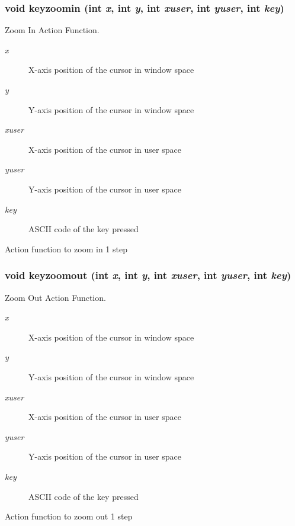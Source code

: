 \subsubsection{\setlength{\rightskip}{0pt plus 5cm}void keyzoomin (int {\em x}, int {\em y}, int {\em xuser}, int {\em yuser}, int {\em key})}\label{xtvutils_8c_a210}


Zoom In Action Function. 

\begin{Desc}
\item[Parameters:]
\begin{description}
\item[{\em x}]X-axis position of the cursor in window space \item[{\em y}]Y-axis position of the cursor in window space \item[{\em xuser}]X-axis position of the cursor in user space \item[{\em yuser}]Y-axis position of the cursor in user space \item[{\em key}]ASCII code of the key pressed\end{description}
\end{Desc}
Action function to zoom in 1 step 
\subsubsection{\setlength{\rightskip}{0pt plus 5cm}void keyzoomout (int {\em x}, int {\em y}, int {\em xuser}, int {\em yuser}, int {\em key})}\label{xtvutils_8c_a211}


Zoom Out Action Function. 

\begin{Desc}
\item[Parameters:]
\begin{description}
\item[{\em x}]X-axis position of the cursor in window space \item[{\em y}]Y-axis position of the cursor in window space \item[{\em xuser}]X-axis position of the cursor in user space \item[{\em yuser}]Y-axis position of the cursor in user space \item[{\em key}]ASCII code of the key pressed\end{description}
\end{Desc}
Action function to zoom out 1 step 
